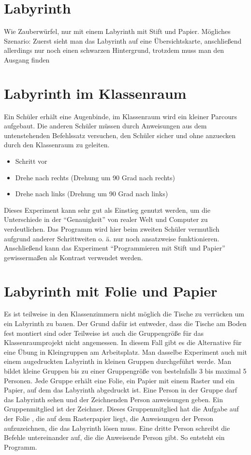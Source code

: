 \section{Labyrinth}\label{labyrinth}

Wie Zauberwürfel, nur mit einem Labyrinth mit Stift und Papier.
Mögliches Szenario: Zuerst sieht man das Labyrinth auf eine
Übersichtskarte, anschließend allerdings nur noch einen schwarzen
Hintergrund, trotzdem muss man den Ausgang finden

\section{Labyrinth im Klassenraum}\label{labyrinth-im-klassenraum}

Ein Schüler erhält eine Augenbinde, im Klassenraum wird ein kleiner
Parcours aufgebaut. Die anderen Schüler müssen durch Anweisungen aus dem
untenstehenden Befehlssatz versuchen, den Schüler sicher und ohne
anzuecken durch den Klassenraum zu geleiten.

\begin{itemize}
\item
  Schritt vor
\item
  Drehe nach rechts (Drehung um 90 Grad nach rechts)
\item
  Drehe nach links (Drehung um 90 Grad nach links)
\end{itemize}

Dieses Experiment kann sehr gut als Einstieg genutzt werden, um die
Unterschiede in der ``Genauigkeit'' von realer Welt und Computer zu
verdeutlichen. Das Programm wird hier beim zweiten Schüler vermutlich
aufgrund anderer Schrittweiten o. ä. nur noch ansatzweise funktionieren.
Anschließend kann das Experiment ``Programmieren mit Stift und Papier''
gewissermaßen als Kontrast verwendet werden.

\section{Labyrinth mit Folie und
Papier}\label{labyrinth-mit-folie-und-papier}

Es ist teilweise in den Klassenzimmern nicht möglich die Tische zu
verrücken um ein Labyrinth zu bauen. Der Grund dafür ist entweder, dass
die Tische am Boden fest montiert sind oder Teilweise ist auch die
Gruppengröße für das Klassenraumprojekt nicht angemessen. In diesem Fall
gibt es die Alternative für eine Übung in Kleingruppen am Arbeitsplatz.
Man dasselbe Experiment auch mit einem augedruckten Labyrinth in kleinen
Gruppen durchgeführt werde. Man bildet kleine Gruppen bis zu einer
Gruppengröße von bestelnfalls 3 bis maximal 5 Personen. Jede Gruppe
erhält eine Folie, ein Papier mit einem Raster und ein Papier, auf dem
das Labyrinth abgedruckt ist. Eine Person in der Gruppe darf das
Labyrinth sehen und der Zeichnenden Person anweisungen geben. Ein
Gruppenmitglied ist der Zeichner. Dieses Gruppenmitglied hat die Aufgabe
auf der Folie , die auf dem Rasterpapier liegt, die Anweisungen der
Person aufzuzeichnen, die das Labyrinth lösen muss. Eine dritte Person
schreibt die Befehle untereinander auf, die die Anweisende Person gibt.
So entsteht ein Programm.

